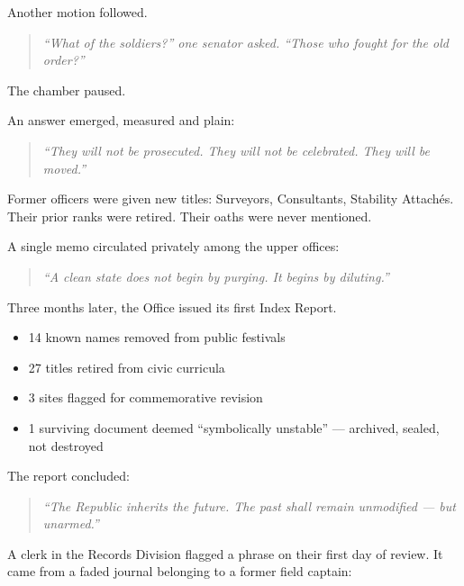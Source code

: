 \documentclass[12pt]{article}
\begin{document}
\vspace{1em}

Another motion followed.

\begin{quote}
\textit{“What of the soldiers?” one senator asked. “Those who fought for the old order?”}
\end{quote}

The chamber paused.

An answer emerged, measured and plain:

\begin{quote}
\textit{“They will not be prosecuted. They will not be celebrated. They will be moved.”}
\end{quote}

Former officers were given new titles: Surveyors, Consultants, Stability Attachés. Their prior ranks were retired. Their oaths were never mentioned.

A single memo circulated privately among the upper offices:

\begin{quote}
\textit{“A clean state does not begin by purging. It begins by diluting.”}
\end{quote}

\vspace{1em}

Three months later, the Office issued its first Index Report.

\begin{itemize}
    \item 14 known names removed from public festivals
    \item 27 titles retired from civic curricula
    \item 3 sites flagged for commemorative revision
    \item 1 surviving document deemed ``symbolically unstable'' --- archived, sealed, not destroyed
\end{itemize}

The report concluded:

\begin{quote}
\textit{“The Republic inherits the future. The past shall remain unmodified --- but unarmed.”}
\end{quote}

\vspace{1em}

A clerk in the Records Division flagged a phrase on their first day of review. It came from a faded journal belonging to a former field captain:
\end{document}
